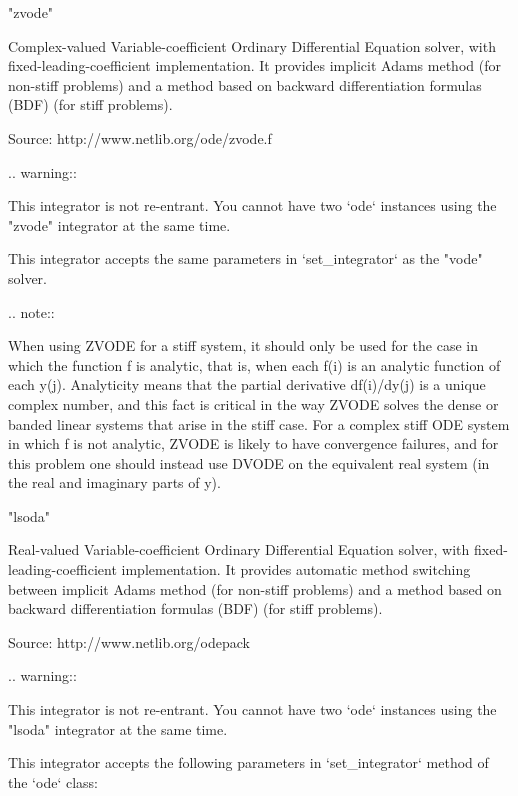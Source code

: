 \begin{DoxyVerb}
"zvode"

    Complex-valued Variable-coefficient Ordinary Differential Equation
    solver, with fixed-leading-coefficient implementation.  It provides
    implicit Adams method (for non-stiff problems) and a method based on
    backward differentiation formulas (BDF) (for stiff problems).

    Source: http://www.netlib.org/ode/zvode.f

    .. warning::

       This integrator is not re-entrant. You cannot have two `ode`
       instances using the "zvode" integrator at the same time.

    This integrator accepts the same parameters in `set_integrator`
    as the "vode" solver.

    .. note::

        When using ZVODE for a stiff system, it should only be used for
        the case in which the function f is analytic, that is, when each f(i)
        is an analytic function of each y(j).  Analyticity means that the
        partial derivative df(i)/dy(j) is a unique complex number, and this
        fact is critical in the way ZVODE solves the dense or banded linear
        systems that arise in the stiff case.  For a complex stiff ODE system
        in which f is not analytic, ZVODE is likely to have convergence
        failures, and for this problem one should instead use DVODE on the
        equivalent real system (in the real and imaginary parts of y).

"lsoda"

    Real-valued Variable-coefficient Ordinary Differential Equation
    solver, with fixed-leading-coefficient implementation. It provides
    automatic method switching between implicit Adams method (for non-stiff
    problems) and a method based on backward differentiation formulas (BDF)
    (for stiff problems).

    Source: http://www.netlib.org/odepack

    .. warning::

       This integrator is not re-entrant. You cannot have two `ode`
       instances using the "lsoda" integrator at the same time.

    This integrator accepts the following parameters in `set_integrator`
    method of the `ode` class:


\end{DoxyVerb}
